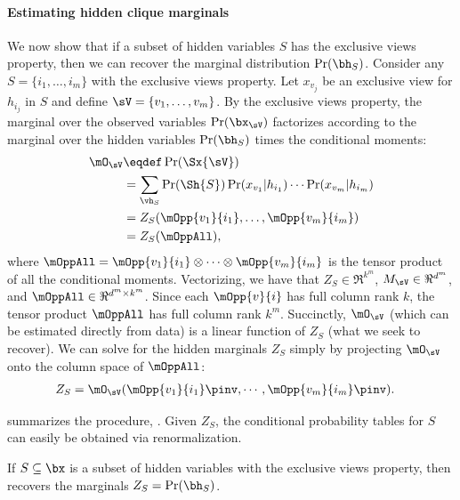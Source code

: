\paragraph{Estimating hidden clique marginals}

We now show that if a subset of hidden variables $S$ has the exclusive views property,
then we can recover the marginal distribution $\Pr(\bh_S)$.
Consider any $S = \{i_1, \ldots, i_m\}$ with the exclusive views property. Let
  $x_{v_j}$ be an exclusive view for $h_{i_j}$ in $S$ and define $\sV
  = \{v_1, \ldots, v_m\}$. %
By the exclusive views property,
the marginal over the observed variables $\Pr(\bx_\sV)$
factorizes according to the marginal over the hidden variables $\Pr(\bh_S)$
times the conditional moments:
\begin{align*}
  \mO_\sV 
  &\eqdef \Pr(\Sx{\sV}) \\
  &= \sum_{\vh_S} \Pr(\Sh{S}) 
                    \Pr(x_{v_1} | h_{i_1}) \cdots \Pr(x_{v_m} | h_{i_m}) \\
  &= Z_{S}(\mOpp{v_1}{i_1},\dots,\mOpp{v_m}{i_m}) \\
  &= Z_{S}(\mOppAll),
\end{align*}
where $\mOppAll = \mOpp{v_1}{i_1} \otimes \cdots \otimes \mOpp{v_m}{i_m}$ is the tensor product of
all the conditional moments.
Vectorizing, we have that
$Z_S \in \Re^{k^m}$,
$M_\sV \in \Re^{d^m}$,
and $\mOppAll \in \Re^{d^m \times k^m}$.
Since each $\mOpp{v}{i}$ has full column rank $k$,
the tensor product $\mOppAll$ has full column rank $k^m$.
Succinctly, $\mO_\sV$ (which can be estimated directly from data)
is a linear function of $Z_S$ (what we seek to recover).
We can solve for the hidden marginals $Z_S$ simply by projecting $\mO_\sV$ onto the column
space of $\mOppAll$:
\begin{align*}
  Z_{S} &= \mO_\sV(\mOpp{v_1}{i_1}\pinv,\cdots,\mOpp{v_m}{i_m}\pinv).
\end{align*}

 summarizes the procedure, \LearnClique.
Given $Z_S$, the conditional probability tables for $S$ can easily be
obtained via renormalization.
\begin{theorem}
If $S \subseteq \bx$ is a subset of hidden variables with the exclusive views property,
then  recovers the marginals $Z_S = \Pr(\bh_S)$.
\end{theorem}

